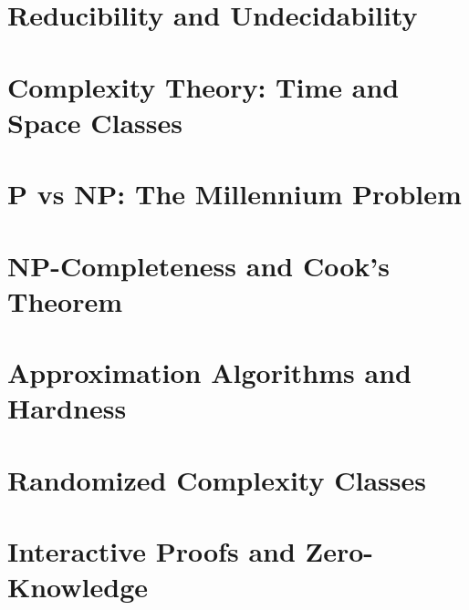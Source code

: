 \chapter{Reducibility and Undecidability}
\chapter{Complexity Theory: Time and Space Classes}
\chapter{P vs NP: The Millennium Problem}
\chapter{NP-Completeness and Cook's Theorem}
\chapter{Approximation Algorithms and Hardness}
\chapter{Randomized Complexity Classes}
\chapter{Interactive Proofs and Zero-Knowledge}
